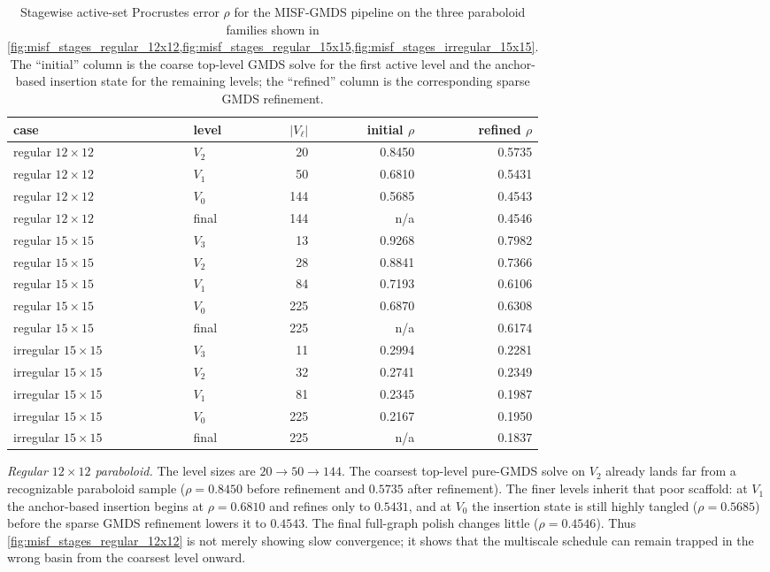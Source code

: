 \documentclass[11pt]{article}
\begin{document}
\begin{table}[t]
  \centering
  \small
  \caption{Stagewise active-set Procrustes error $\rho$ for the MISF-GMDS
  pipeline on the three paraboloid families shown in
  \cref{fig:misf_stages_regular_12x12,fig:misf_stages_regular_15x15,fig:misf_stages_irregular_15x15}.  The
  ``initial'' column is the coarse top-level GMDS solve for the first active
  level and the anchor-based insertion state for the remaining levels; the
  ``refined'' column is the corresponding sparse GMDS refinement.}
  \label{tab:misf_stage_rho}
  \begin{tabular}{llrrr}
    \toprule
    case & level & $|V_\ell|$ & initial $\rho$ & refined $\rho$ \\
    \midrule
    regular $12\times 12$ & $V_2$ & 20  & 0.8450 & 0.5735 \\
    regular $12\times 12$ & $V_1$ & 50  & 0.6810 & 0.5431 \\
    regular $12\times 12$ & $V_0$ & 144 & 0.5685 & 0.4543 \\
    regular $12\times 12$ & final & 144 & n/a    & 0.4546 \\
    \midrule
    regular $15\times 15$ & $V_3$ & 13  & 0.9268 & 0.7982 \\
    regular $15\times 15$ & $V_2$ & 28  & 0.8841 & 0.7366 \\
    regular $15\times 15$ & $V_1$ & 84  & 0.7193 & 0.6106 \\
    regular $15\times 15$ & $V_0$ & 225 & 0.6870 & 0.6308 \\
    regular $15\times 15$ & final & 225 & n/a    & 0.6174 \\
    \midrule
    irregular $15\times 15$ & $V_3$ & 11  & 0.2994 & 0.2281 \\
    irregular $15\times 15$ & $V_2$ & 32  & 0.2741 & 0.2349 \\
    irregular $15\times 15$ & $V_1$ & 81  & 0.2345 & 0.1987 \\
    irregular $15\times 15$ & $V_0$ & 225 & 0.2167 & 0.1950 \\
    irregular $15\times 15$ & final & 225 & n/a    & 0.1837 \\
    \bottomrule
  \end{tabular}
\end{table}

\emph{Regular $12\times 12$ paraboloid.}
The level sizes are $20 \rightarrow 50 \rightarrow 144$.  The coarsest
top-level pure-GMDS solve on $V_2$ already lands far from a recognizable
paraboloid sample ($\rho = 0.8450$ before refinement and $0.5735$ after
refinement).  The finer levels inherit that poor scaffold: at $V_1$ the
anchor-based insertion begins at $\rho = 0.6810$ and refines only to
$0.5431$, and at $V_0$ the insertion state is still highly tangled
($\rho = 0.5685$) before the sparse GMDS refinement lowers it to $0.4543$.
The final full-graph polish changes little ($\rho = 0.4546$).  Thus
\cref{fig:misf_stages_regular_12x12} is not merely showing slow convergence;
it shows that the multiscale schedule can remain trapped in the wrong basin
from the coarsest level onward.
\end{document}
